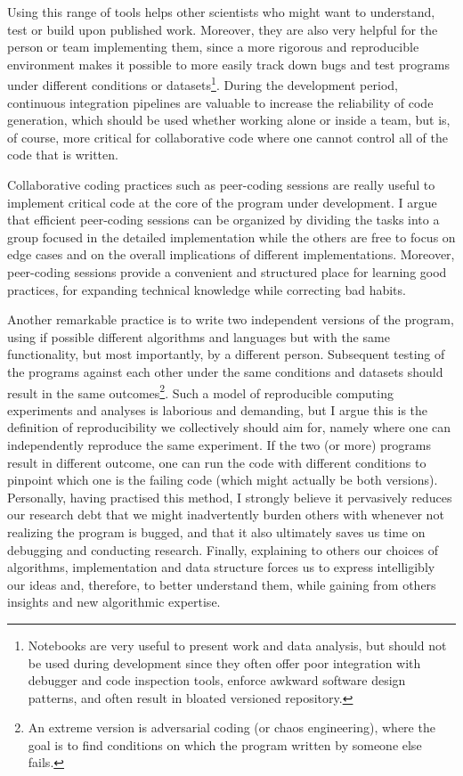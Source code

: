 Using this range of tools helps other scientists who might want to understand, test or build upon published work.
Moreover, they are also very helpful for the person or team implementing them, since a more rigorous and reproducible environment makes it possible to more easily track down bugs and test programs under different conditions or datasets\footnote{Notebooks are very useful to present work and data analysis, but should not be used during development since they often offer poor integration with debugger and code inspection tools, enforce awkward software design patterns, and often result in bloated versioned repository.}.
During the development period, continuous integration pipelines are valuable to increase the reliability of code generation, which should be used whether working alone or inside a team, but is, of course, more critical for collaborative code where one cannot control all of the code that is written.

Collaborative coding practices such as peer-coding sessions are really useful to implement critical code at the core of the program under development.
I argue that efficient peer-coding sessions can be organized by dividing the tasks into a group focused in the detailed implementation while the others are free to focus on edge cases and on the overall implications of different implementations.
Moreover, peer-coding sessions provide a convenient and structured place for learning good practices, for expanding technical knowledge while correcting bad habits.

Another remarkable practice is to write two independent versions of the program, using if possible different algorithms and languages but with the same functionality, but most importantly, by a different person.
Subsequent testing of the programs against each other under the same conditions and datasets should result in the same outcomes\footnote{An extreme version is adversarial coding (or chaos engineering), where the goal is to find conditions on which the program written by someone else fails.}.
Such a model of reproducible computing experiments and analyses is laborious and demanding, but I argue this is the definition of reproducibility we collectively should aim for, namely where one can independently reproduce the same experiment.
If the two (or more) programs result in different outcome, one can run the code with different conditions to pinpoint which one is the failing code (which might actually be both versions).
Personally, having practised this method, I strongly believe it pervasively reduces our research debt that we might inadvertently burden others with whenever not realizing the program is bugged, and that it also ultimately saves us time on debugging and conducting research.
Finally, explaining to others our choices of algorithms, implementation and data structure forces us to express intelligibly our ideas and, therefore, to better understand them, while gaining from others insights and new algorithmic expertise.


